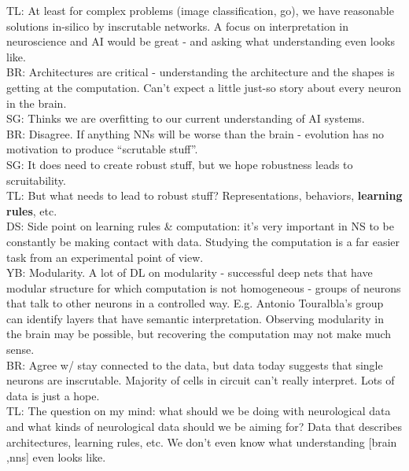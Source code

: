 \documentclass[12pt]{article}
\begin{document}
TL: At least for complex problems (image classification, go), we have reasonable solutions in-silico by inscrutable networks. A focus on interpretation in neuroscience and AI would be great - and asking what understanding even looks like. \\

BR: Architectures are critical - understanding the architecture and the shapes is getting at the computation. Can't expect a little just-so story about every neuron in the brain. \\

SG: Thinks we are overfitting to our current understanding of AI systems. \\

BR: Disagree. If anything NNs will be worse than the brain - evolution has no motivation to produce ``scrutable stuff''. \\

SG: It does need to create robust stuff, but we hope robustness leads to scruitability. \\

TL: But what needs to lead to robust stuff? Representations, behaviors, \textbf{learning rules}, etc. \\

DS: Side point on learning rules \& computation: it's very important in NS to be constantly be making contact with data. Studying the computation is a far easier task from an experimental point of view. \\

YB: Modularity. A lot of DL on modularity - successful deep nets that have modular structure for which computation is not homogeneous - groups of neurons that talk to other neurons in a controlled way. E.g. Antonio Touralbla's group can identify layers that have semantic interpretation. Observing modularity in the brain may be possible, but recovering the computation may not make much sense. \\

BR: Agree w/ stay connected to the data, but data today suggests that single neurons are inscrutable. Majority of cells in circuit can't really interpret. Lots of data is just a hope. \\

TL: The question on my mind: what should we be doing with neurological data and what kinds of neurological data should we be aiming for? Data that describes architectures, learning rules, etc. We don't even know what understanding [brain ,nns] even looks like. \\
\end{document}
